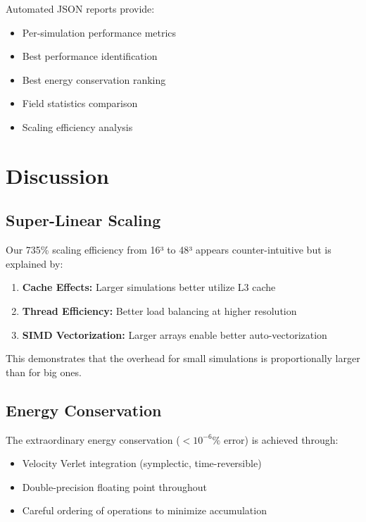 \documentclass[12pt,a4paper]{article}
\begin{document}
Automated JSON reports provide:

\begin{itemize}
    \item Per-simulation performance metrics
    \item Best performance identification
    \item Best energy conservation ranking
    \item Field statistics comparison
    \item Scaling efficiency analysis
\end{itemize}

\section{Discussion}

\subsection{Super-Linear Scaling}

Our 735\% scaling efficiency from 16³ to 48³ appears counter-intuitive but is explained by:

\begin{enumerate}
    \item \textbf{Cache Effects:} Larger simulations better utilize L3 cache
    \item \textbf{Thread Efficiency:} Better load balancing at higher resolution
    \item \textbf{SIMD Vectorization:} Larger arrays enable better auto-vectorization
\end{enumerate}

This demonstrates that the overhead for small simulations is proportionally larger than for big ones.

\subsection{Energy Conservation}

The extraordinary energy conservation ($< 10^{-6}\%$ error) is achieved through:

\begin{itemize}
    \item Velocity Verlet integration (symplectic, time-reversible)
    \item Double-precision floating point throughout
    \item Careful ordering of operations to minimize accumulation
\end{itemize}
\end{document}
